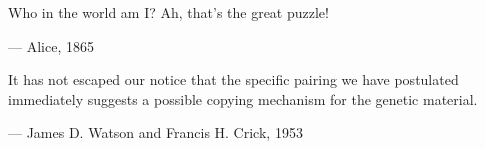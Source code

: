 
\begin{flushright}
\begin{hangleftquote}{\QENOpen}{\QENClose}
Who in the world am I? Ah, that's the great puzzle!
\end{hangleftquote}
\par\smallskip
\normalfont — Alice, 1865
\end{flushright}

\medskip

\begin{flushright}
\begin{hangleftquote}{\QENOpen}{\QENClose}
It has not escaped our notice that the specific pairing we have postulated\\
immediately suggests a possible copying mechanism for the genetic material.
\end{hangleftquote}
\par\smallskip
\normalfont — James D. Watson and Francis H. Crick, 1953
\end{flushright}
